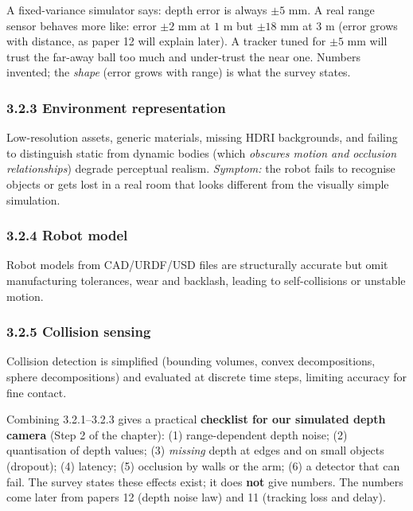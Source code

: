 \documentclass[11pt,a4paper]{article}
\begin{document}
\begin{toy}
A fixed-variance simulator says: depth error is always $\pm 5$ mm. A real range sensor behaves more
like: error $\pm 2$ mm at $1$ m but $\pm 18$ mm at $3$ m (error grows with distance, as paper 12
will explain later). A tracker tuned for $\pm5$ mm will trust the far-away ball too much and
under-trust the near one. Numbers invented; the \emph{shape} (error grows with range) is what the
survey states.
\end{toy}

\subsubsection*{3.2.3 Environment representation}
Low-resolution assets, generic materials, missing HDRI backgrounds, and failing to distinguish
static from dynamic bodies (which \emph{obscures motion and occlusion relationships}) degrade
perceptual realism. \emph{Symptom:} the robot fails to recognise objects or gets lost in a real
room that looks different from the visually simple simulation.

\subsubsection*{3.2.4 Robot model}
Robot models from CAD/URDF/USD files are structurally accurate but omit manufacturing
tolerances, wear and backlash, leading to self-collisions or unstable motion.

\subsubsection*{3.2.5 Collision sensing}
Collision detection is simplified (bounding volumes, convex decompositions, sphere
decompositions) and evaluated at discrete time steps, limiting accuracy for fine contact.

\begin{ours}
Combining 3.2.1--3.2.3 gives a practical \textbf{checklist for our simulated depth camera}
(Step 2 of the chapter): (1) range-dependent depth noise; (2) quantisation of depth values;
(3) \emph{missing} depth at edges and on small objects (dropout); (4) latency; (5) occlusion
by walls or the arm; (6) a detector that can fail. The survey states these effects exist; it does
\textbf{not} give numbers. The numbers come later from papers 12 (depth noise law) and 11
(tracking loss and delay).
\end{ours}
\end{document}
